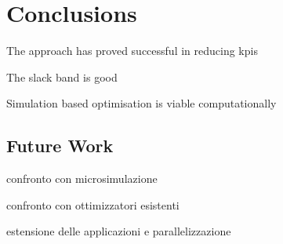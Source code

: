 \chapter{Conclusions} \label{c:conclusions}

The approach has proved successful in reducing kpis

The slack band is good

Simulation based optimisation is viable computationally


\section{Future Work}
confronto con microsimulazione

confronto con ottimizzatori esistenti

estensione delle applicazioni e parallelizzazione